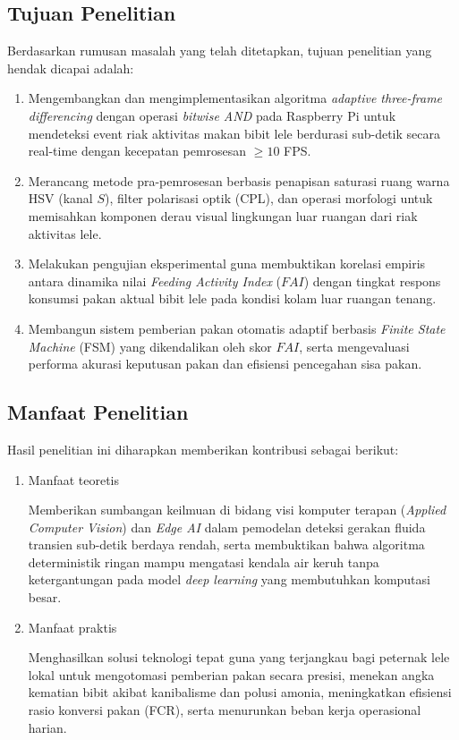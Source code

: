 \subsection{Tujuan Penelitian}
Berdasarkan rumusan masalah yang telah ditetapkan, tujuan penelitian yang hendak dicapai adalah:
\begin{enumerate}
    \item Mengembangkan dan mengimplementasikan algoritma \textit{adaptive three-frame differencing} dengan operasi \textit{bitwise AND} pada Raspberry Pi untuk mendeteksi event riak aktivitas makan bibit lele berdurasi sub-detik secara real-time dengan kecepatan pemrosesan $\ge 10$ FPS.
    \item Merancang metode pra-pemrosesan berbasis penapisan saturasi ruang warna HSV (kanal $S$), filter polarisasi optik (CPL), dan operasi morfologi untuk memisahkan komponen derau visual lingkungan luar ruangan dari riak aktivitas lele.
    \item Melakukan pengujian eksperimental guna membuktikan korelasi empiris antara dinamika nilai \textit{Feeding Activity Index} ($FAI$) dengan tingkat respons konsumsi pakan aktual bibit lele pada kondisi kolam luar ruangan tenang.
    \item Membangun sistem pemberian pakan otomatis adaptif berbasis \textit{Finite State Machine} (FSM) yang dikendalikan oleh skor $FAI$, serta mengevaluasi performa akurasi keputusan pakan dan efisiensi pencegahan sisa pakan.
\end{enumerate}

\newpage
\subsection{Manfaat Penelitian}
Hasil penelitian ini diharapkan memberikan kontribusi sebagai berikut:
\begin{enumerate}
\renewcommand{\theenumi}{\alph{enumi}}
\renewcommand{\labelenumi}{\theenumi.}
    \item Manfaat teoretis
    
    Memberikan sumbangan keilmuan di bidang visi komputer terapan (\textit{Applied Computer Vision}) dan \textit{Edge AI} dalam pemodelan deteksi gerakan fluida transien sub-detik berdaya rendah, serta membuktikan bahwa algoritma deterministik ringan mampu mengatasi kendala air keruh tanpa ketergantungan pada model \textit{deep learning} yang membutuhkan komputasi besar.
    
    \item Manfaat praktis
    
    Menghasilkan solusi teknologi tepat guna yang terjangkau bagi peternak lele lokal untuk mengotomasi pemberian pakan secara presisi, menekan angka kematian bibit akibat kanibalisme dan polusi amonia, meningkatkan efisiensi rasio konversi pakan (FCR), serta menurunkan beban kerja operasional harian.
\end{enumerate}
